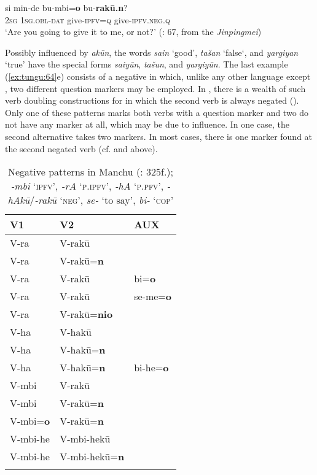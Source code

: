     \ex
    \gll si  min-de    bu-mbi=\textbf{{o}} bu-\textbf{{rak}}\textbf{{\=u.}}\textbf{{n}}?\\
    2\textsc{sg}  1\textsc{sg}.\textsc{obl}-\textsc{dat}  give-\textsc{ipfv}=\textsc{q}  give-\textsc{ipfv}.\textsc{neg.q}\\
    \glt ‘Are you going to give it to me, or not?’ (\citealt{Hauer2007}: 67, from the \textit{Jinpingmei})
    \z
    \z 

Possibly influenced by \textit{ak\=u}\textit{n}, the words \textit{sain} ‘good’, \textit{tašan} ‘false‘, and \textit{yargiyan} ‘true’ have the special  forms \textit{saiy\=un}, \textit{tašun}, and \textit{yargiy\=un}. The last example (\ref{ex:tungu:64}e) consists of a negative  in which, unlike any other  language except , two different question markers may be employed. In , there is a wealth of such verb doubling constructions for  in which the second verb is always negated (). Only one of these patterns marks both verbs with a question marker and two do not have any marker at all, which may be due to  influence. In one case, the second alternative takes two markers. In most cases, there is one marker found at the second negated verb (cf.  and  above).

\begin{table}
\caption{Negative  patterns in Manchu (\citealt{Gorelova2002}: 325f.); \textit{-mbi} ‘\textsc{ipfv}’, \textit{-rA} ‘\textsc{p.ipfv}’, \textit{-hA} ‘\textsc{p.pfv}’, \textit{-hAk}\textit{\=u}/\textit{-rak}\textit{\=u} ‘\textsc{neg}’, \textit{se-} ‘to say’, \textit{bi-} ‘\textsc{cop}’}
\label{tab:tungu:2}

\begin{tabularx}{\textwidth}{XXl}
\lsptoprule

\textbf{V1} & \textbf{V2} & \textbf{AUX}\\
\midrule
V-ra & V-rak\=u & \\
V-ra & V-rak\=u=\textbf{n} & \\
V-ra & V-rak\=u & bi=\textbf{o}\\
V-ra & V-rak\=u & se-me=\textbf{o}\\
V-ra & V-rak\=u=\textbf{nio} & \\
V-ha & V-hak\=u & \\
V-ha & V-hak\=u=\textbf{n} & \\
V-ha & V-hak\=u=\textbf{n} & bi-he=\textbf{o}\\
V-mbi & V-rak\=u & \\
V-mbi & V-rak\=u=\textbf{n} & \\
V-mbi=\textbf{o} & V-rak\=u=\textbf{n} & \\
V-mbi-he & V-mbi-hek\=u & \\
V-mbi-he & V-mbi-hek\=u=\textbf{n} & \\
\lspbottomrule
\end{tabularx}
\end{table}

